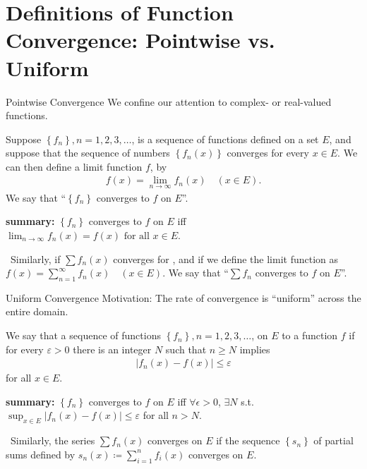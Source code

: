 \documentclass[10pt,xcolor=table,dvipsnames]{beamer}
\newcommand{\tb}[1]{\textbf{#1}}
\begin{document}
\section{Definitions of Function Convergence: Pointwise vs. Uniform}

\begin{frame}{Pointwise Convergence}
We confine our attention to complex- or real-valued functions.
\begin{Definition}
    Suppose $\left\{f_n\right\}, n=1,2,3, \ldots$, is a sequence of functions defined on a set $E$, and suppose that the sequence of numbers $\left\{f_n(x)\right\}$ {converges for every $x \in E$}. We can then define a limit function $f$, by
\begin{align}
f(x)=\lim _{n \rightarrow \infty} f_n(x) \quad(x \in E) .
\end{align}
We say that ``$\left\{f_n\right\}$ converges to $f$  on $E$''.
\end{Definition}
\tb{summary:} 
{\small $\left\{f_n\right\}$ converges to $f$  on $E$
iff
$\lim _{n \rightarrow \infty} f_n(x)=f(x) \text{ for all } x \in E$.}
\pause
\begin{Remark}[Series]
    {\ Similarly, if $\sum f_n(x)$ converges for , and if we define the limit function  as 
$f(x)=\sum_{n=1}^{\infty} f_n(x) \quad(x \in E).$
We say that ``$\sum f_n$ converges to $f$  on $E$''.}
\end{Remark}
\end{frame}

\begin{frame}{Uniform Convergence}
Motivation:  The rate of convergence is ``uniform'' across the entire domain.
\begin{Definition}
   We say that a sequence of functions $\left\{f_n\right\}, n=1,2,3, \ldots$,  on $E$ to a function $f$ if for every $\varepsilon>0$ there is an integer $N$ such that $n \geq N$ implies
\begin{align}
\left|f_n(x)-f(x)\right| \leq \varepsilon
\end{align}
for all $x \in E$.
\end{Definition}
\tb{summary:} $\left\{f_n\right\}$ converges to $f$  on $E$
iff $\forall \epsilon>0$, $\exists N$ s.t. $\sup_{x\in E} \left|f_n(x)-f(x)\right| \leq \varepsilon$ for all $n>N$.
\pause
\begin{Remark}[Series]
    {\ Similarly, the series $\sum f_n(x)$ converges  on $E$ if the sequence $\left\{s_n\right\}$ of partial sums defined by
$s_n(x)\coloneqq\sum_{i=1}^n f_i(x)$
converges  on $E$.}
\end{Remark}
\end{frame}
\end{document}
